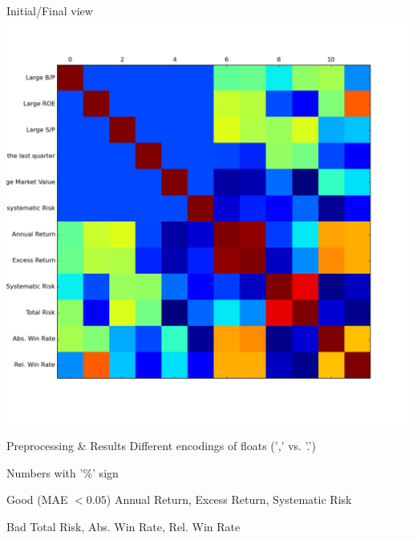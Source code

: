 \documentclass[12pt]{beamer}
\begin{document}
\begin{frame}{Initial/Final view}
\includegraphics[height=\textheight,width=\textwidth,keepaspectratio]{plots/stock_final.png}
\end{frame}

\begin{frame}{Preprocessing \& Results}
Different encodings of floats (',' vs. '.')

Numbers with '\%' sign

\begin{block}{Good (MAE $< 0.05$)}
Annual Return, Excess Return, Systematic Risk
\end{block}

\begin{block}{Bad}
Total Risk, Abs. Win Rate, Rel. Win Rate
\end{block}
\end{frame}
\end{document}

